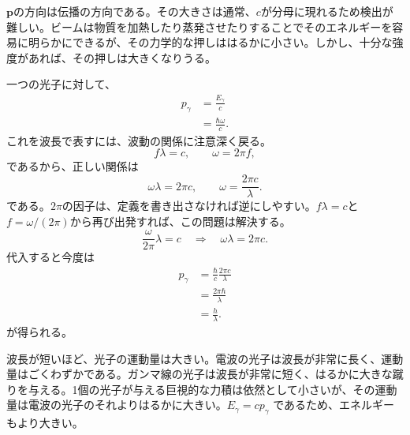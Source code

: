 \(\mathbf p\)の方向は伝播の方向である。その大きさは通常、\(c\)が分母に現れるため検出が難しい。ビームは物質を加熱したり蒸発させたりすることでそのエネルギーを容易に明らかにできるが、その力学的な押しははるかに小さい。しかし、十分な強度があれば、その押しは大きくなりうる。

一つの光子に対して、
\begin{align}
p_\gamma
&=\frac{E_\gamma}{c}\\
&=\frac{\hbar\omega}{c}.
\end{align}
これを波長で表すには、波動の関係に注意深く戻る。
\begin{equation}
f\lambda=c,
\qquad
\omega=2\pi f,
\end{equation}
であるから、正しい関係は
\begin{equation}
\omega\lambda=2\pi c,
\qquad
\omega=\frac{2\pi c}{\lambda}.
\end{equation}
である。\(2\pi\)の因子は、定義を書き出さなければ逆にしやすい。\(f\lambda=c\)と\(f=\omega/(2\pi)\)から再び出発すれば、この問題は解決する。
\begin{equation}
\frac{\omega}{2\pi}\lambda=c
\quad\Longrightarrow\quad
\omega\lambda=2\pi c.
\end{equation}
代入すると今度は
\begin{align}
p_\gamma
&=\frac{\hbar}{c}\frac{2\pi c}{\lambda}\\
&=\frac{2\pi\hbar}{\lambda}\\
&=\frac{h}{\lambda}.
\end{align}
が得られる。

\begin{classroomqa}
\end{classroomqa}

波長が短いほど、光子の運動量は大きい。電波の光子は波長が非常に長く、運動量はごくわずかである。ガンマ線の光子は波長が非常に短く、はるかに大きな蹴りを与える。1個の光子が与える巨視的な力積は依然として小さいが、その運動量は電波の光子のそれよりはるかに大きい。\(E_\gamma=cp_\gamma\) であるため、エネルギーもより大きい。

